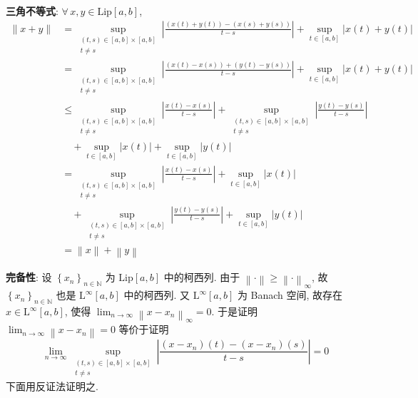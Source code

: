 \documentclass[\ROOT/main.tex]{subfiles}
\begin{document}
\noindent\textbf{三角不等式}:
$\forall \, x, y \in \mathrm{Lip} [a, b]$,
\begin{align*}
    \left\| x + y \right\|
    &=
    \sup_{\substack{\left( t, s \right) \in [a, b] \times [a, b] \\ t \neq s}} \left| \frac{\left( x \left( t \right) + y \left( t \right) \right) - \left( x \left( s \right) + y \left( s \right) \right)}{t - s} \right| + \sup_{t \in [a, b]} \left| x \left( t \right) + y \left( t \right) \right| \\
    &=
    \sup_{\substack{\left( t, s \right) \in [a, b] \times [a, b] \\ t \neq s}} \left| \frac{\left( x \left( t \right) - x \left( s \right) \right) + \left( y \left( t \right) - y \left( s \right) \right)}{t - s} \right| + \sup_{t \in [a, b]} \left| x \left( t \right) + y \left( t \right) \right| \\
    &\leqslant
    \sup_{\substack{\left( t, s \right) \in [a, b] \times [a, b] \\ t \neq s}} \left| \frac{x \left( t \right) - x \left( s \right)}{t - s} \right| + \sup_{\substack{\left( t, s \right) \in [a, b] \times [a, b] \\ t \neq s}} \left| \frac{y \left( t \right) - y \left( s \right)}{t - s} \right| \\
    &\quad +
    \sup_{t \in [a, b]} \left| x \left( t \right) \right| + \sup_{t \in [a, b]} \left| y \left( t \right) \right| \\
    &=
    \sup_{\substack{\left( t, s \right) \in [a, b] \times [a, b] \\ t \neq s}} \left| \frac{x \left( t \right) - x \left( s \right)}{t - s} \right| + \sup_{t \in [a, b]} \left| x \left( t \right) \right| \\
    &\quad +
    \sup_{\substack{\left( t, s \right) \in [a, b] \times [a, b] \\ t \neq s}} \left| \frac{y \left( t \right) - y \left( s \right)}{t - s} \right| + \sup_{t \in [a, b]} \left| y \left( t \right) \right| \\
    &= \left\| x \right\| + \left\| y \right\|
\end{align*}

\noindent\textbf{完备性}:
设 $\left\{ x_n \right\}_{n \in \mathbb{N}}$ 为 $\mathrm{Lip} [a, b]$ 中的柯西列.
由于 $\left\| \cdot \right\| \geqslant \left\| \cdot \right\|_{\infty}$, 故 $\left\{ x_n \right\}_{n \in \mathbb{N}}$ 也是 $\mathrm{L}^\infty [a, b]$ 中的柯西列.
又 $\mathrm{L}^\infty [a, b]$ 为 Banach 空间, 故存在 $x \in \mathrm{L}^\infty [a, b]$, 使得 $\displaystyle \lim_{n \to \infty} \left\| x - x_n \right\|_{\infty} = 0$.
于是证明 $\displaystyle \lim_{n \to \infty} \left\| x - x_n \right\| = 0$ 等价于证明
\[
    \lim_{n \to \infty} \sup_{\substack{\left( t, s \right) \in [a, b] \times [a, b] \\ t \neq s}} \left| \frac{\left( x - x_n \right)\left( t \right) - \left( x - x_n \right)\left( s \right)}{t - s} \right|
    =
    0
\]
下面用反证法证明之.
\end{document}
